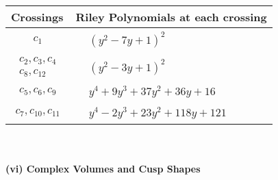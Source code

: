 \documentclass[1p]{elsarticle_modified}
\theoremstyle{definition}
\begin{document}
\begin{tabular}{m{50pt}|m{274pt}}
Crossings & \hspace{64pt}Riley Polynomials at each crossing \\
\hline $$\begin{aligned}c_{1}\end{aligned}$$&$\begin{aligned}
&(y^2-7 y+1)^2
\end{aligned}$\\
\hline $$\begin{aligned}c_{2},c_{3},c_{4}\\c_{8},c_{12}\end{aligned}$$&$\begin{aligned}
&(y^2-3 y+1)^2
\end{aligned}$\\
\hline $$\begin{aligned}c_{5},c_{6},c_{9}\end{aligned}$$&$\begin{aligned}
&y^4+9 y^3+37 y^2+36 y+16
\end{aligned}$\\
\hline $$\begin{aligned}c_{7},c_{10},c_{11}\end{aligned}$$&$\begin{aligned}
&y^4-2 y^3+23 y^2+118 y+121
\end{aligned}$\\
\hline
\end{tabular}\\~\\
\newpage\flushleft \textbf{(vi) Complex Volumes and Cusp Shapes}
\end{document}
